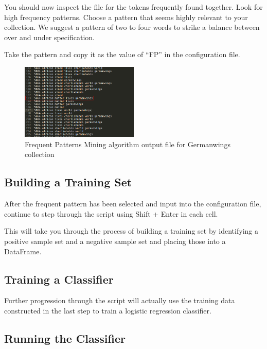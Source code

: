 You should now inspect the file for the tokens frequently found together. Look for high frequency patterns. Choose a pattern that seems highly relevant to your collection. We suggest a pattern of two to four words to strike a balance between over and under specification.

Take the pattern and copy it as the value of ``FP'' in the configuration file.

\begin{figure}[th!]
  \centering
  \includegraphics[width=0.5\textwidth]{figures/Germanwings_FP.png}
    \caption{Frequent Patterns Mining algorithm output file for Germanwings collection}\label{fig:collection_config}
\end{figure}


\subsection{Building a Training Set}

After the frequent pattern has been selected and input into the configuration file, continue to step through the script using Shift + Enter  in each cell.

This will take you through the process of building a training set by identifying a positive sample set and a negative sample set and placing those into a DataFrame.

\subsection{Training a Classifier}

Further progression through the script will actually use the training data constructed in the last step to train a logistic regression classifier.

\subsection{Running the Classifier}

